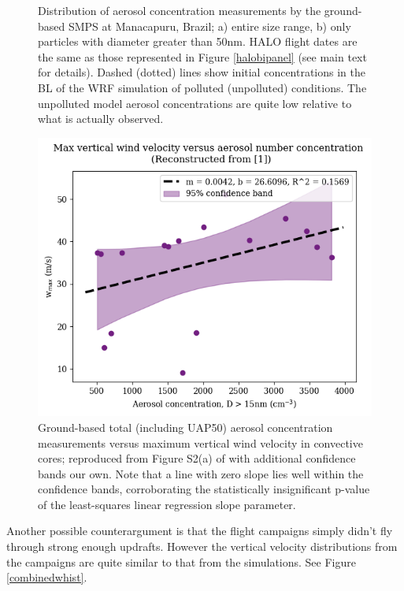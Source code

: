\documentclass{article}
\begin{document}
\begin{figure}[ht]
\begin{subfigure}{0.7\textwidth}
		\label{goamauap50hist}
		\caption{}
	\end{subfigure}
	\caption{Distribution of aerosol concentration measurements by the ground-based SMPS at Manacapuru, Brazil; a) entire size range, b) only particles with diameter greater than 50nm. HALO flight dates are the same as those represented in Figure \ref{halobipanel} (see main text for details). Dashed (dotted) lines show initial concentrations in the BL of the WRF simulation of polluted (unpolluted) conditions. The unpolluted model aerosol concentrations are quite low relative to what is actually observed.}
	\label{goamahist}
\end{figure}
\begin{figure}[ht]
    \centering
    \includegraphics[width=12cm]{revhalo/v2_FINAL_fan_fig_s2a.png}
    \caption{Ground-based total (including UAP50) aerosol concentration measurements versus maximum vertical wind velocity in convective cores; reproduced from Figure S2(a) of \cite{Fan2018} with additional confidence bands our own. Note that a line with zero slope lies well within the confidence bands, corroborating the statistically insignificant p-value of the least-squares linear regression slope parameter.}
    \label{fans2a}
\end{figure}

Another possible counterargument is that the flight campaigns simply didn't fly through strong enough updrafts. However the vertical velocity distributions from the campaigns are quite similar to that from the simulations. See Figure \ref{combinedwhist}. 
\end{document}
